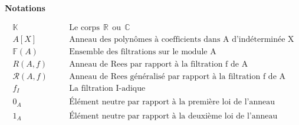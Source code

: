 \newpage

\begin{center}
	\LARGE{\textbf{Notations}}
\end{center}


\begin{eqnarray*}
	\mathbb{K} & & \quad \text{Le  corps} \ \ \mathbb{R} \ \ \text{ou} \ \ \mathbb{C}\\
	A[X] & & \quad \text{Anneau des polynômes à coefficients dans A d'indéterminée X}\\
	\mathbb{F}(A) & & \quad \text{Ensemble des filtrations sur le module A}\\
	R(A,f) & & \quad \text{Anneau de Rees par rapport à la filtration f de A}\\
	\mathcal{R}(A,f) & & \quad \text{Anneau de Rees généralisé par rapport à la filtration f de A}\\
	f_{I} & & \quad \text{La filtration I-adique} \\
	0_{A} & & \quad \text{Élément neutre par rapport à la première loi de l'anneau} \\
	1_{A} & & \quad \text{Élément neutre par rapport à la deuxième loi de l'anneau} \\
\end{eqnarray*}